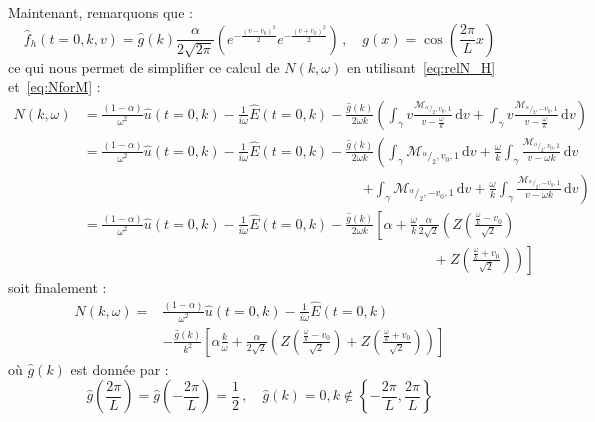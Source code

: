 Maintenant, remarquons que :
$$
  \hat{f}_h(t=0,k,v) = \hat{g}(k)\frac{\alpha}{2\sqrt{2\pi}}\left( e^{-\frac{(v-v_0)^2}{2}}  e^{-\frac{(v+v_0)^2}{2}}\right)\,,\quad g(x) = \cos\left(\frac{2\pi}{L}x\right)
$$
ce qui nous permet de simplifier ce calcul de $N(k,\omega)$ en utilisant~\eqref{eq:relN_H} et~\eqref{eq:NforM} :
$$
  \begin{aligned}
    N(k,\omega)
      & = \frac{(1-\alpha)}{\omega^2}\hat{u}(t=0,k) - \frac{1}{i\omega}\hat{E}(t=0,k) - \frac{\hat{g}(k)}{2\omega k}\left( \int_\gamma v\frac{\mathcal{M}_{^\alpha/_2,v_0,1}}{v-\frac{\omega}{k}}\,\mathrm{d}v  +  \int_\gamma v\frac{\mathcal{M}_{^\alpha/_2,-v_0,1}}{v-\frac{\omega}{k}}\,\mathrm{d}v \right) \\
      & = \frac{(1-\alpha)}{\omega^2}\hat{u}(t=0,k) - \frac{1}{i\omega}\hat{E}(t=0,k) - \frac{\hat{g}(k)}{2\omega k}\left( \int_\gamma\mathcal{M}_{^\alpha/_2,v_0,1}\,\mathrm{d}v + \frac{\omega}{k}\int_\gamma \frac{\mathcal{M}_{^\alpha/_2,v_0,1}}{v-\omega{k}}\,\mathrm{d}v\right. \\
      & \qquad\qquad\qquad\qquad\qquad\qquad\qquad\qquad\qquad\qquad \left. + \int_\gamma\mathcal{M}_{^\alpha/_2,-v_0,1}\,\mathrm{d}v + \frac{\omega}{k}\int_\gamma \frac{\mathcal{M}_{^\alpha/_2,-v_0,1}}{v-\omega{k}}\,\mathrm{d}v \right) \\
      & = \frac{(1-\alpha)}{\omega^2}\hat{u}(t=0,k) - \frac{1}{i\omega}\hat{E}(t=0,k) - \frac{\hat{g}(k)}{2\omega k}\left[ \alpha + \frac{\omega}{k}\frac{\alpha}{2\sqrt{2}}\left( Z\left(\frac{\frac{\omega}{k}-v_0}{\sqrt{2}}\right) \right.\right. \\
      & \qquad\qquad\qquad\qquad\qquad\qquad\qquad\qquad\qquad\qquad\qquad\qquad\quad + \left.\left.Z\left(\frac{\frac{\omega}{k}+v_0}{\sqrt{2}}\right) \right)\right]
  \end{aligned}
$$
soit finalement :
\begin{equation}
  \begin{aligned}
    N(k,\omega) =& \frac{(1-\alpha)}{\omega^2}\hat{u}(t=0,k) - \frac{1}{i\omega}\hat{E}(t=0,k) \\
      &-\frac{\hat{g}(k)}{k^2}\left[ \alpha\frac{k}{\omega} + \frac{\alpha}{2\sqrt{2}}\left( Z\left(\frac{\frac{\omega}{k}-v_0}{\sqrt{2}}\right) + Z\left(\frac{\frac{\omega}{k}+v_0}{\sqrt{2}}\right) \right) \right]
  \end{aligned}
  \label{eq:N_hchyb}
\end{equation}
où $\hat{g}(k)$ est donnée par :
\begin{equation}
  \hat{g}\left(\frac{2\pi}{L}\right) = \hat{g}\left(-\frac{2\pi}{L}\right) = \frac{1}{2}\,,\quad \hat{g}(k) = 0, k\notin\left\{-\frac{2\pi}{L} ,\frac{2\pi}{L} \right\}
\label{eq:gk}
\end{equation}

